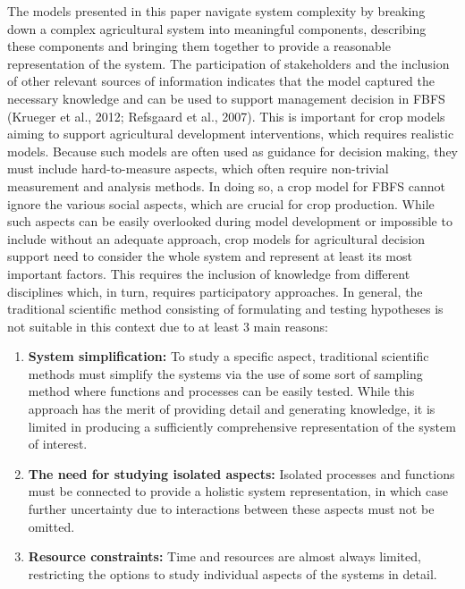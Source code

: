 \documentclass[]{elsarticle} %
\begin{document}
The models presented in this paper navigate system complexity by breaking down a complex agricultural system into meaningful components, describing these components and bringing them together to provide a reasonable representation of the system. The participation of stakeholders and the inclusion of other relevant sources of information indicates that the model captured the necessary knowledge and can be used to support management decision in FBFS (Krueger et al., 2012; Refsgaard et al., 2007). This is important for crop models aiming to support agricultural development interventions, which requires realistic models. Because such models are often used as guidance for decision making, they must include hard-to-measure aspects, which often require non-trivial measurement and analysis methods. In doing so, a crop model for FBFS cannot ignore the various social aspects, which are crucial for crop production. While such aspects can be easily overlooked during model development or impossible to include without an adequate approach, crop models for agricultural decision support need to consider the whole system and represent at least its most important factors. This requires the inclusion of knowledge from different disciplines which, in turn, requires participatory approaches. In general, the traditional scientific method consisting of formulating and testing hypotheses is not suitable in this context due to at least 3 main reasons:

\begin{enumerate}
\def\labelenumi{\arabic{enumi}.}
\item
  \textbf{System simplification:} To study a specific aspect, traditional scientific methods must simplify the systems via the use of some sort of sampling method where functions and processes can be easily tested. While this approach has the merit of providing detail and generating knowledge, it is limited in producing a sufficiently comprehensive representation of the system of interest.
\item
  \textbf{The need for studying isolated aspects:} Isolated processes and functions must be connected to provide a holistic system representation, in which case further uncertainty due to interactions between these aspects must not be omitted.
\item
  \textbf{Resource constraints:} Time and resources are almost always limited, restricting the options to study individual aspects of the systems in detail.
\end{enumerate}
\end{document}
